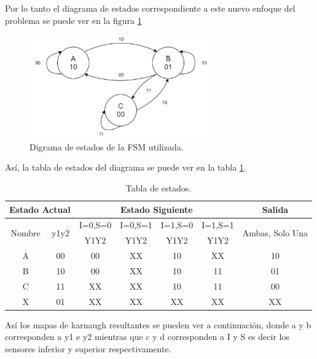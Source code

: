 %
Por lo tanto el diagrama de estados correspondiente a este nuevo enfoque del problema se puede ver en la figura \ref{ej1_fsm2}
%
\begin{figure}[H]
    \centering
    \includegraphics[width=0.7\textwidth]{figs/Ej1/diagrama_chico.jpg} %
    \caption{Digrama de estados de la FSM utilizada.}
    \label{ej1_fsm2}
\end{figure}
%
\noindent
Así, la tabla de estados del diagrama se puede ver en la tabla \ref{ej1_tabla}.
%
\begin{table}[H]
\centering
\caption{Tabla de estados.}
\label{ej1_tabla}
\begin{tabular}{|c|c|c|c|c|c|c|}
\hline
\multicolumn{2}{|c|}{Estado Actual}             & \multicolumn{4}{c|}{Estado Siguiente} & Salida                           \\ \hline
\multirow{2}{*}{Nombre} & \multirow{2}{*}{y1y2} & I=0,S=0 & I=0,S=1 & I=1,S=0 & I=1,S=1 & \multirow{2}{*}{Ambas, Solo Una} \\ \cline{3-6}
                        &                       & Y1Y2    & Y1Y2    & Y1Y2    & Y1Y2    &                                  \\ \hline
A                       & 00                    & 00      & XX      & 10      & XX      & 10                               \\ \hline
B                       & 10                    & 00      & XX      & 10      & 11      & 01                               \\ \hline
C                       & 11                    & XX      & XX      & 10      & 11      & 00                               \\ \hline
X                       & 01                    & XX      & XX      & XX      & XX      & XX                               \\ \hline
\end{tabular}
\end{table}
%
\noindent
Así los mapas de karnaugh resultantes se pueden ver a continuación, donde a y b corresponden a y1 e y2 mientras que c y d corresponden a I y S es decir los sensores inferior y superior respectivamente.\\
